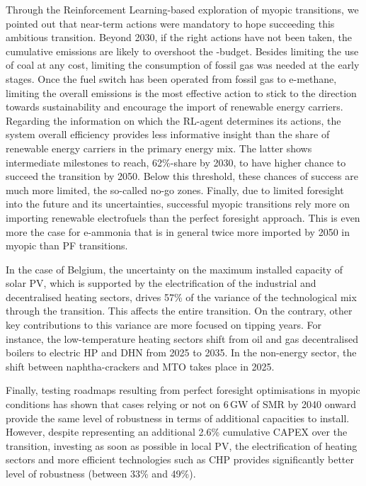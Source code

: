 Through the Reinforcement Learning-based exploration of myopic transitions, we pointed out that near-term actions were mandatory to hope succeeding this ambitious transition.  Beyond 2030, if the right actions have not been taken, the cumulative emissions are likely to overshoot the -budget. Besides limiting the use of coal at any cost, limiting the consumption of fossil gas was needed at the early stages. Once the fuel switch has been operated from fossil gas to e-methane, limiting the overall emissions is the most effective action to stick to the direction towards sustainability and encourage the import of renewable energy carriers. Regarding the information on which the \gls{RL}-agent determines its actions, the system overall efficiency provides less informative insight than the share of renewable energy carriers in the primary energy mix. The latter shows intermediate milestones to reach, 62\%-share by 2030, to have higher chance to succeed the transition by 2050. Below this threshold, these chances of success are much more limited, the so-called no-go zones. Finally, due to limited foresight into the future and its uncertainties, successful myopic transitions rely more on importing renewable electrofuels than the perfect foresight approach. This is even more the case for e-ammonia that is in general twice more imported by 2050 in myopic than PF transitions.

In the case of Belgium, the uncertainty on the maximum installed capacity of solar \gls{PV}, which is supported by the electrification of the industrial and decentralised heating sectors, drives 57\% of the variance of the technological mix through the transition. This affects the entire transition. On the contrary, other key contributions to this variance are more focused on tipping years. For instance, the low-temperature heating sectors shift from oil and gas decentralised boilers to electric \acrfull{HP} and \acrfull{DHN} from 2025 to 2035. In the non-energy sector, the shift between naphtha-crackers and \acrfull{MTO} takes place in 2025.

Finally, testing roadmaps resulting from perfect foresight optimisations in myopic conditions has shown that cases relying or not on 6\,GW of \gls{SMR} by 2040 onward provide the same level of robustness in terms of additional capacities to install. However, despite representing an additional 2.6\% cumulative CAPEX over the transition, investing as soon as possible in local \gls{PV}, the electrification of heating sectors and more efficient technologies such as \gls{CHP} provides significantly better level of robustness (between 33\% and 49\%).\\


